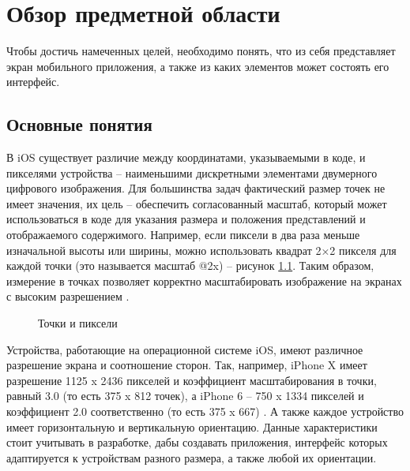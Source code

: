 \chapter{Обзор предметной области}

Чтобы достичь намеченных целей, необходимо понять, что из себя представляет экран мобильного приложения, а также из каких элементов может состоять его интерфейс.

\section{Основные понятия}
В iOS существует различие между координатами, указываемыми в коде, и пикселями устройства \cite{pixel} -- наименьшими дискретными элементами двумерного цифрового изображения. 
Для большинства задач фактический размер точек \cite{point} не имеет значения, их цель -- обеспечить согласованный масштаб, который может использоваться в коде для указания размера и положения представлений и отображаемого содержимого. 
Например, если пиксели в два раза меньше изначальной высоты или ширины, можно использовать квадрат 2×2 пикселя для каждой точки (это называется масштаб @2x) -- рисунок \ref{fig:points}. 
Таким образом, измерение в точках позволяет корректно масштабировать изображение на экранах с высоким разрешением \cite{hig}.

\begin{figure}[h!]
	\caption{Точки и пиксели}
	\label{fig:points}
\end{figure}

Устройства, работающие на операционной системе iOS, имеют различное разрешение экрана и соотношение сторон. 
Так, например, iPhone X имеет разрешение 1125 x 2436 пикселей и коэффициент масштабирования в точки, равный 3.0 (то есть 375 x 812 точек), а iPhone 6  -- 750 x 1334 пикселей и коэффициент 2.0 соответственно (то есть 375 x 667) \cite{displays}. 
А также каждое устройство имеет горизонтальную и вертикальную ориентацию. 
Данные характеристики стоит учитывать в разработке, дабы создавать приложения, интерфейс которых адаптируется к устройствам разного размера, а также любой их ориентации. 

